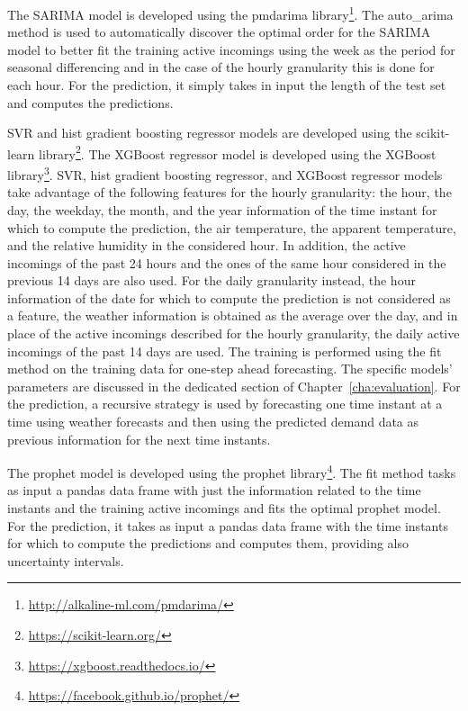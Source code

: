 The SARIMA model is developed using the pmdarima library\footnote{ \url{http://alkaline-ml.com/pmdarima/} }.
The auto\_arima method is used to automatically discover the optimal order for the SARIMA model to better fit the training active incomings using the week as the period for seasonal differencing and in the case of the hourly granularity this is done for each hour.
For the prediction, it simply takes in input the length of the test set and computes the predictions.

SVR and hist gradient boosting regressor models are developed using the scikit-learn library\footnote{ \url{https://scikit-learn.org/} }.
The XGBoost regressor model is developed using the XGBoost library\footnote{ \url{https://xgboost.readthedocs.io/} }.
SVR, hist gradient boosting regressor, and XGBoost regressor models take advantage of the following features for the hourly granularity: the hour, the day, the weekday, the month, and the year information of the time instant for which to compute the prediction, the air temperature, the apparent temperature, and the relative humidity in the considered hour.
In addition, the active incomings of the past 24 hours and the ones of the same hour considered in the previous 14 days are also used.
For the daily granularity instead, the hour information of the date for which to compute the prediction is not considered as a feature, the weather information is obtained as the average over the day, and in place of the active incomings described for the hourly granularity, the daily active incomings of the past 14 days are used.
The training is performed using the fit method on the training data for one-step ahead forecasting.
The specific models' parameters are discussed in the dedicated section of Chapter~\ref{cha:evaluation}.
For the prediction, a recursive strategy is used by forecasting one time instant at a time using weather forecasts and then using the predicted demand data as previous information for the next time instants.

The prophet model is developed using the prophet library\footnote{ \url{https://facebook.github.io/prophet/} }.
The fit method tasks as input a pandas data frame with just the information related to the time instants and the training active incomings and fits the optimal prophet model.
For the prediction, it takes as input a pandas data frame with the time instants for which to compute the predictions and computes them, providing also uncertainty intervals.


